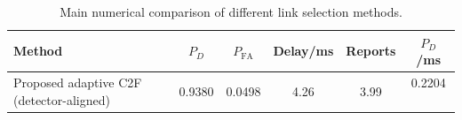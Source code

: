 \begin{table}[t]
    \centering
    \caption{Main numerical comparison of different link selection methods.}
    \label{tab:main_summary}
    \begin{tabular}{l c c c c c}
        \hline
        Method & $P_D$ & $P_{\mathrm{FA}}$ & Delay/ms & Reports & $P_D$/ms \\
        \hline
        Proposed adaptive C2F (detector-aligned) & 0.9380 & 0.0498 & 4.26 & 3.99 & 0.2204 \
        \hline
    \end{tabular}
\end{table}
